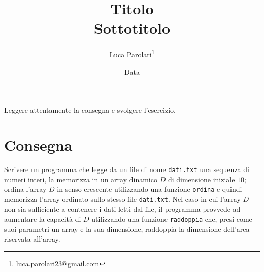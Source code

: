 \documentclass[addpoints,12pt,answers]{exam}
\author{Luca Parolari\footnote{\href{mailto:luca.parolari23@gmail.com}{luca.parolari23@gmail.com}}}
\begin{document}
    
    \title{Titolo\\ \large Sottotitolo}
    \date{Data}
    
    \maketitle
    
    Leggere attentamente la consegna e svolgere l'esercizio.
    
    \section{Consegna}
    
    Scrivere un programma che legge da un file di nome \texttt{dati.txt} una sequenza di numeri interi, la memorizza in un array dinamico $D$ di dimensione iniziale $10$; ordina l'array $D$ in senso crescente utilizzando una funzione \texttt{ordina} e quindi memorizza l'array ordinato sullo stesso file \texttt{dati.txt}. Nel caso in cui l'array $D$ non sia sufficiente a contenere i dati letti dal file, il programma provvede ad aumentare la capacità di $D$ utilizzando una funzione \texttt{raddoppia} che, presi come suoi parametri un array e la sua dimensione, raddoppia la dimensione dell'area riservata all'array.
    
\end{document}
